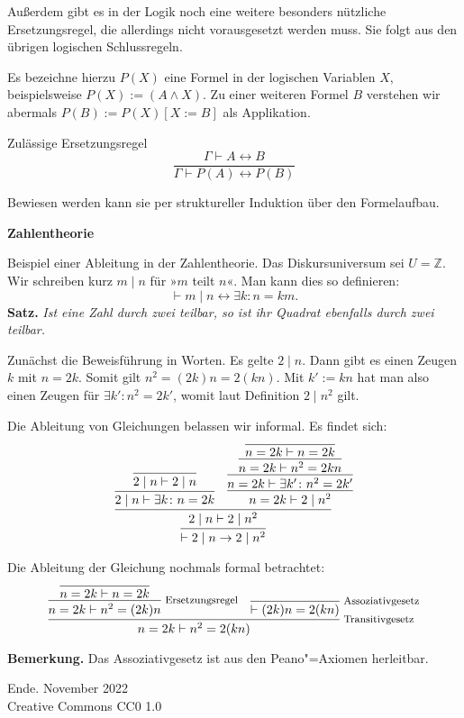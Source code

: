 \documentclass[8pt]{beamer}
\newcommand{\modest}[1]{{\small\color{gray}#1}}
\newcommand{\strong}[1]{\textsf{\textbf{#1}}}
\newcommand{\infernote}[1]{\!\text{\footnotesize #1}}
\newcommand{\centerheadline}[1]{%
  \begin{center}\strong{#1}\end{center}}
\newcommand{\parspace}{\vspace{0.8em}}
\newcommand{\cond}{\rightarrow}
\newcommand{\bicond}{\leftrightarrow}
\newcommand{\Z}{\mathbb Z}
\begin{document}
\begin{frame}
Außerdem gibt es in der Logik noch eine weitere besonders nützliche
Ersetzungsregel, die allerdings nicht vorausgesetzt werden muss.
Sie folgt aus den übrigen logischen Schlussregeln.

\parspace
Es bezeichne hierzu $P(X)$ eine Formel in der logischen Variablen $X$,
beispielsweise $P(X) := (A\land X)$. Zu einer weiteren Formel
$B$ verstehen wir abermals $P(B):=P(X)[X:=B]$ als Applikation.\pause

\begin{block}{Zulässige Ersetzungsregel}
\[\dfrac{\Gamma\vdash A\leftrightarrow B}{\Gamma\vdash P(A)\leftrightarrow P(B)}\]
\end{block}\pause
Bewiesen werden kann sie per struktureller Induktion über den
Formelaufbau.
\end{frame}

\begin{frame}
\centerheadline{Zahlentheorie}
\end{frame}

\begin{frame}
Beispiel einer Ableitung in der Zahlentheorie.
Das Diskursuniversum sei $U=\Z$. Wir schreiben kurz $m\mid n$
für »$m$ teilt $n$«. Man kann dies so definieren:
\[\vdash m\mid n\bicond\exists k\colon n=km.\]\pause
\strong{Satz.} \emph{Ist eine Zahl durch zwei teilbar, so
ist ihr Quadrat ebenfalls durch zwei teilbar.}\pause

\parspace
Zunächst die Beweisführung in Worten.
Es gelte $2\mid n$. Dann gibt es einen Zeugen $k$ mit $n=2k$.
Somit gilt $n^2 = (2k)n = 2(kn)$. Mit $k':=kn$ hat
man also einen Zeugen für $\exists k'\colon n^2=2k'$, womit
laut Definition $2\mid n^2$ gilt.\pause

\parspace
Die Ableitung von Gleichungen belassen wir informal.
Es findet sich:
\[
\infer{\vdash 2\mid n \cond 2\mid n^2}{
  \infer{2\mid n\vdash 2\mid n^2}{
    \infer{2\mid n\vdash\exists k\colon n=2k}{
      \infer{2\mid n\vdash 2\mid n}{}}
  & \infer{n=2k\vdash 2\mid n^2}{
      \infer{n=2k\vdash\exists k'\colon n^2=2k'}{
        \infer{n=2k\vdash n^2 = 2kn}{
          \infer{n=2k\vdash n=2k}{}}}}}}
\]
\end{frame}

\begin{frame}
Die Ableitung der Gleichung nochmals formal betrachtet:
\[
\infer[\infernote{Transitivgesetz}]{n=2k\vdash n^2 = 2(kn)}{
  \infer[\infernote{Ersetzungsregel}]{n=2k\vdash n^2 = (2k)n}{
    \infer{n=2k\vdash n=2k}{}
  }
& \infer[\infernote{Assoziativgesetz}]{\vdash (2k)n = 2(kn)}{}}
\]
\begin{footnotesize}
\strong{Bemerkung.} Das Assoziativgesetz ist aus den
Peano"=Axiomen herleitbar.
\end{footnotesize}
\end{frame}

\begin{frame}
Ende.
\vfill\hfill\modest{November 2022}\\
\hfill\modest{Creative Commons CC0 1.0}
\end{frame}
\end{document}
